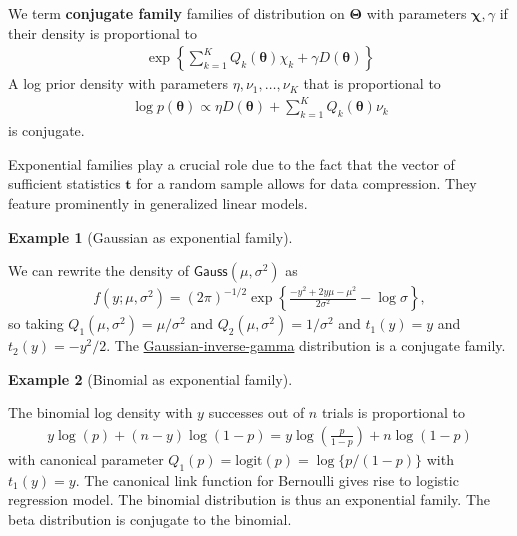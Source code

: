 \documentclass[
  11pt,
  letterpaper,
]{scrbook}
\theoremstyle{definition}
\newtheorem{example}{Example}[chapter]
\theoremstyle{plain}
\theoremstyle{plain}
\theoremstyle{plain}
\theoremstyle{definition}
\theoremstyle{definition}
\theoremstyle{plain}
\theoremstyle{plain}
\theoremstyle{remark}
\begin{document}
We term \textbf{conjugate family} families of distribution on
\(\boldsymbol{\Theta}\) with parameters \(\boldsymbol{\chi}, \gamma\) if
their density is proportional to \begin{align*}
\exp\left\{ \sum_{k=1}^K Q_k(\boldsymbol{\theta}) \chi_k + \gamma D(\boldsymbol{\theta})\right\}
\end{align*} A log prior density with parameters
\(\eta, \nu_1, \ldots, \nu_K\) that is proportional to \begin{align*}
\log p(\boldsymbol{\theta}) \propto \eta D(\boldsymbol{\theta}) + \sum_{k=1}^K Q_k(\boldsymbol{\theta}) \nu_k
\end{align*} is conjugate.

Exponential families play a crucial role due to the fact that the vector
of sufficient statistics \(\boldsymbol{t}\) for a random sample allows
for data compression. They feature prominently in generalized linear
models.

\begin{example}[Gaussian as exponential
family]\protect\hypertarget{exm-exponential-family-gaussian}{}\label{exm-exponential-family-gaussian}

We can rewrite the density of \(\mathsf{Gauss}(\mu, \sigma^2)\) as
\begin{align*}
f(y; \mu, \sigma^2) = (2\pi)^{-1/2}\exp\left\{ \frac{-y^2 + 2y\mu - \mu^2}{2\sigma^2}-\log \sigma\right\},
\end{align*} so taking \(Q_1(\mu, \sigma^2)=\mu/\sigma^2\) and
\(Q_2(\mu, \sigma^2)=1/\sigma^2\) and \(t_1(y) = y\) and
\(t_2(y) = -y^2/2.\) The
\href{https://en.wikipedia.org/wiki/Normal-inverse-gamma_distribution}{Gaussian-inverse-gamma}
distribution is a conjugate family.

\end{example}

\begin{example}[Binomial as exponential
family]\protect\hypertarget{exm-exponential-family-binom}{}\label{exm-exponential-family-binom}

The binomial log density with \(y\) successes out of \(n\) trials is
proportional to \begin{align*}
y \log(p) + (n-y) \log(1-p) = y\log\left( \frac{p}{1-p}\right) + n \log(1-p)
\end{align*} with canonical parameter
\(Q_1(p) = \mathrm{logit}(p) = \log\{p/(1-p)\}\) with \(t_1(y) = y.\)
The canonical link function for Bernoulli gives rise to logistic
regression model. The binomial distribution is thus an exponential
family. The beta distribution is conjugate to the binomial.

\end{example}
\end{document}
